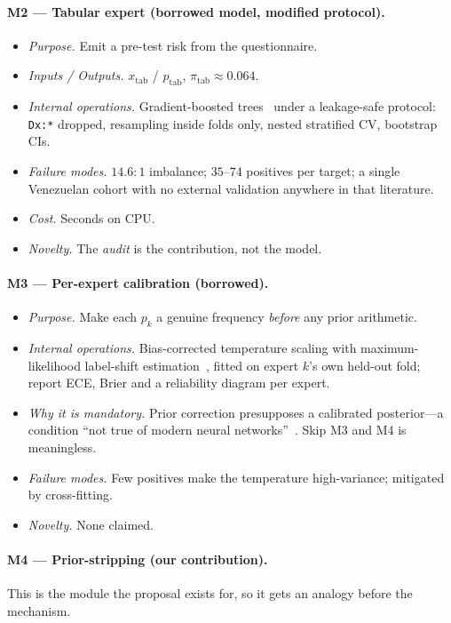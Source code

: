 \documentclass[sigplan,nonacm,screen]{acmart}
\begin{document}
\paragraph{M2 --- Tabular expert (borrowed model, modified protocol).}
\begin{itemize}
  \item \emph{Purpose.} Emit a pre-test risk from the questionnaire.
  \item \emph{Inputs / Outputs.} $x_{\mathrm{tab}}$ / $p_{\mathrm{tab}}$, $\pi_{\mathrm{tab}}\approx0.064$.
  \item \emph{Internal operations.} Gradient-boosted trees~\cite{grinsztajn2022why} under a leakage-safe protocol: \texttt{Dx:*} dropped, resampling inside folds only, nested stratified CV, bootstrap CIs.
  \item \emph{Failure modes.} $14.6{:}1$ imbalance; $35$--$74$ positives per target; a single Venezuelan cohort with no external validation anywhere in that literature.
  \item \emph{Cost.} Seconds on CPU.
  \item \emph{Novelty.} The \emph{audit} is the contribution, not the model.
\end{itemize}

\paragraph{M3 --- Per-expert calibration (borrowed).}
\begin{itemize}
  \item \emph{Purpose.} Make each $p_k$ a genuine frequency \emph{before} any prior arithmetic.
  \item \emph{Internal operations.} Bias-corrected temperature scaling with maximum-likelihood label-shift estimation~\cite{alexandari2020maximum}, fitted on expert $k$'s own held-out fold; report ECE, Brier and a reliability diagram per expert.
  \item \emph{Why it is mandatory.} Prior correction presupposes a calibrated posterior---a condition ``not true of modern neural networks''~\cite{alexandari2020maximum}. Skip M3 and M4 is meaningless.
  \item \emph{Failure modes.} Few positives make the temperature high-variance; mitigated by cross-fitting.
  \item \emph{Novelty.} None claimed.
\end{itemize}

\paragraph{M4 --- Prior-stripping (\textbf{our contribution}).}
This is the module the proposal exists for, so it gets an analogy before the mechanism.
\end{document}
